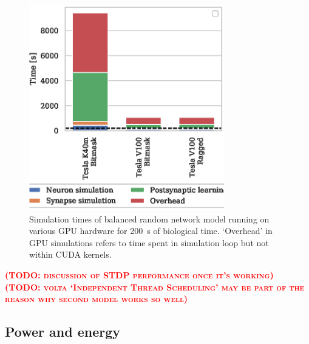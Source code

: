 \documentclass[utf8]{frontiersSCNS} %
\newcommand{\todo}[1]{\textbf{\textsc{\textcolor{red}{(TODO: #1)}}}}
\begin{document}
%
\begin{figure}
    \begin{center}
        \includegraphics[width=85mm]{figures/stdp_performance}
    \end{center}
    \caption{Simulation times of balanced random network model running on various GPU hardware for \SI{200}{\second} of biological time.
    `Overhead' in GPU simulations refers to time spent in simulation loop but not within CUDA kernels.}
    \label{fig:stdp_performance}
\end{figure}
%
\todo{discussion of STDP performance once it's working}
\todo{volta `Independent Thread Scheduling' may be part of the reason why second model works so well}

\subsection{Power and energy}
\end{document}
